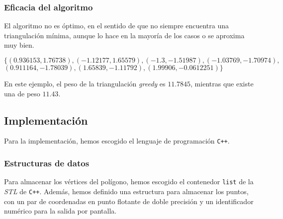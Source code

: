 \documentclass[a4paper, 11pt]{article}
\begin{document}
\subsubsection{Eficacia del algoritmo}
El algoritmo no es óptimo, en el sentido de que no siempre encuentra una triangulación mínima, aunque lo hace en la mayoría de los casos o se aproxima muy bien.



    
\begin{center}
\end{center}



   
$\{      (0.936153,1.76738),
      (-1.12177,1.65579),
      (-1.3,-1.51987),
      (-1.03769,-1.70974),$\\ $
      (0.911164,-1.78039),
      (1.65839,-1.11792),
      (1.99906,-0.0612251)\}$


En este ejemplo, el peso de la triangulación \textit{greedy} es $11.7845$, mientras que existe una de peso $11.43$.


\subsection{Implementación}
Para la implementación, hemos escogido el lenguaje de programación \texttt{C++}.

\subsubsection{Estructuras de datos}
Para almacenar los vértices del polígono, hemos escogido el contenedor \texttt{list} de la \textit{STL} de \texttt{C++}. Además, hemos definido una estructura para almacenar los puntos, con un par de coordenadas en punto flotante de doble precisión y un identificador numérico para la salida por pantalla.
\end{document}
